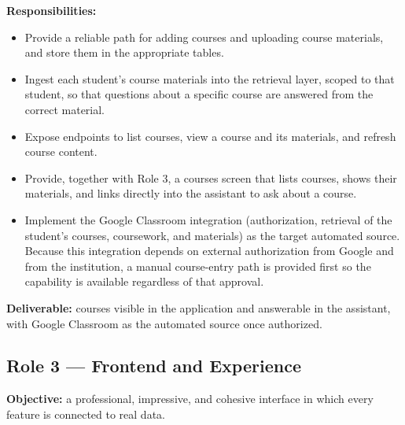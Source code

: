 \documentclass[11pt,a4paper]{article}
\begin{document}
\textbf{Responsibilities:}
\begin{itemize}
  \item Provide a reliable path for adding courses and uploading course materials, and
        store them in the appropriate tables.
  \item Ingest each student's course materials into the retrieval layer, scoped to
        that student, so that questions about a specific course are answered from the
        correct material.
  \item Expose endpoints to list courses, view a course and its materials, and refresh
        course content.
  \item Provide, together with Role 3, a courses screen that lists courses, shows their
        materials, and links directly into the assistant to ask about a course.
  \item Implement the Google Classroom integration (authorization, retrieval of the
        student's courses, coursework, and materials) as the target automated source.
        Because this integration depends on external authorization from Google and
        from the institution, a manual course-entry path is provided first so the
        capability is available regardless of that approval.
\end{itemize}

\textbf{Deliverable:} courses visible in the application and answerable in the
assistant, with Google Classroom as the automated source once authorized.

\subsection{Role 3 --- Frontend and Experience}
\textbf{Objective:} a professional, impressive, and cohesive interface in which every
feature is connected to real data.
\end{document}
